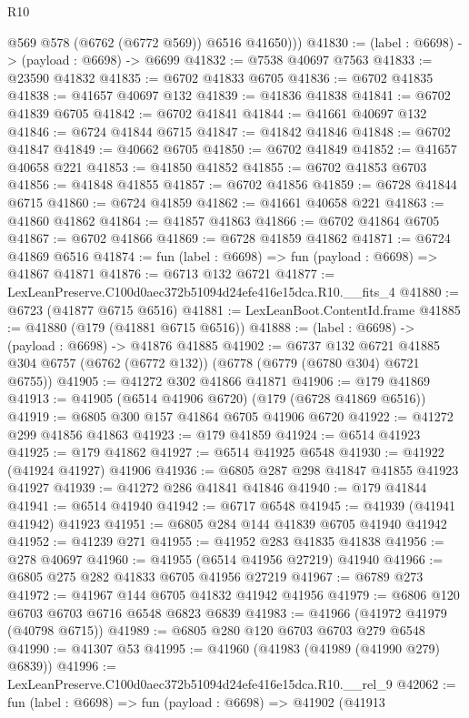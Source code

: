 \begin{lexlean}{R10}
\begin{coremodule}
          @569
          @578
          (@6762 (@6772 @569))
          @6516
          @41650)))
@41830 := (label : @6698) -> (payload : @6698) -> @6699
@41832 := @7538 @40697 @7563
@41833 := @23590 @41832
@41835 := @6702 @41833 @6705
@41836 := @6702 @41835
@41838 := @41657 @40697 @132
@41839 := @41836 @41838
@41841 := @6702 @41839 @6705
@41842 := @6702 @41841
@41844 := @41661 @40697 @132
@41846 := @6724 @41844 @6715
@41847 := @41842 @41846
@41848 := @6702 @41847
@41849 := @40662 @6705
@41850 := @6702 @41849
@41852 := @41657 @40658 @221
@41853 := @41850 @41852
@41855 := @6702 @41853 @6703
@41856 := @41848 @41855
@41857 := @6702 @41856
@41859 := @6728 @41844 @6715
@41860 := @6724 @41859
@41862 := @41661 @40658 @221
@41863 := @41860 @41862
@41864 := @41857 @41863
@41866 := @6702 @41864 @6705
@41867 := @6702 @41866
@41869 := @6728 @41859 @41862
@41871 := @6724 @41869 @6516
@41874 := fun (label : @6698) => fun (payload : @6698) => @41867 @41871
@41876 := @6713 @132 @6721
@41877 := LexLeanPreserve.C100d0aec372b51094d24efe416e15dca.R10.__fits_4
@41880 := @6723 (@41877 @6715 @6516)
@41881 := LexLeanBoot.ContentId.frame
@41885 := @41880 (@179 (@41881 @6715 @6516))
@41888 := (label : @6698) -> (payload : @6698) -> @41876 @41885
@41902 := @6737
    @132
    @6721
    @41885
    @304
    @6757
    (@6762 (@6772 @132))
    (@6778 (@6779 (@6780 @304) @6721 @6755))
@41905 := @41272 @302 @41866 @41871
@41906 := @179 @41869
@41913 := @41905 (@6514 @41906 @6720) (@179 (@6728 @41869 @6516))
@41919 := @6805 @300 @157 @41864 @6705 @41906 @6720
@41922 := @41272 @299 @41856 @41863
@41923 := @179 @41859
@41924 := @6514 @41923
@41925 := @179 @41862
@41927 := @6514 @41925 @6548
@41930 := @41922 (@41924 @41927) @41906
@41936 := @6805 @287 @298 @41847 @41855 @41923 @41927
@41939 := @41272 @286 @41841 @41846
@41940 := @179 @41844
@41941 := @6514 @41940
@41942 := @6717 @6548
@41945 := @41939 (@41941 @41942) @41923
@41951 := @6805 @284 @144 @41839 @6705 @41940 @41942
@41952 := @41239 @271
@41955 := @41952 @283 @41835 @41838
@41956 := @278 @40697
@41960 := @41955 (@6514 @41956 @27219) @41940
@41966 := @6805 @275 @282 @41833 @6705 @41956 @27219
@41967 := @6789 @273
@41972 := @41967 @144 @6705 @41832 @41942 @41956
@41979 := @6806 @120 @6703 @6703 @6716 @6548 @6823 @6839
@41983 := @41966 (@41972 @41979 (@40798 @6715))
@41989 := @6805 @280 @120 @6703 @6703 @279 @6548
@41990 := @41307 @53
@41995 := @41960 (@41983 (@41989 (@41990 @279) @6839))
@41996 := LexLeanPreserve.C100d0aec372b51094d24efe416e15dca.R10.__rel_9
@42062 := fun (label : @6698) =>
  fun (payload : @6698) =>
  @41902
    (@41913

\end{coremodule}
\end{lexlean}
